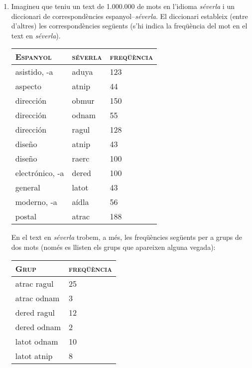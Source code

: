 \begin{enumerate}
\item Imagineu que teniu un text de 1.000.000 de mots en l'idioma
  \emph{séverla} i un diccionari de correspondències
  espanyol--\emph{séverla}. El diccionari estableix (entre d'altres)
  les correspondències següents (s'hi indica la freqüència del mot en
  el text en \emph{séverla}).
  \begin{center}
    \begin{tabular}{l|l|l}
      \hline\hline
      \textsc{Espanyol} & \textsc{séverla} & \textsc{freqüència} \\
      \hline
      \textsf{asistido, -a} & \textsf{aduya} & 123 \\
      \textsf{aspecto} & \textsf{atnip} & 44 \\ 
      \textsf{dirección} & \textsf{obmur} & 150  \\
      \textsf{dirección} & \textsf{odnam} & 55 \\
      \textsf{dirección} & \textsf{ragul} & 128 \\
      \textsf{diseño} & \textsf{atnip} & 43 \\
      \textsf{diseño} & \textsf{raerc} & 100 \\
      \textsf{electrónico, -a} & \textsf{dered} & 100 \\
      \textsf{general} & \textsf{latot}  & 43 \\
      \textsf{moderno, -a} & \textsf{aídla} & 56 \\
      \textsf{postal} & \textsf{atrac} & 188 \\
      \hline
    \end{tabular}
  \end{center}
  En el text en \emph{séverla} trobem, a més, les freqüències següents
  per a grups de dos mots (només es llisten els grups que apareixen
  alguna vegada):
  \begin{center}
    \begin{tabular}{l|l}
      \hline\hline 
      \textsc{Grup} & \textsc{freqüència} \\\hline
      \textsf{atrac ragul} & 25 \\
      \textsf{atrac odnam} & 3 \\
      \textsf{dered ragul} & 12 \\
      \textsf{dered odnam} & 2 \\
      \textsf{latot odnam} & 10 \\
      \textsf{latot atnip} & 8 \\

\end{tabular}
\end{center}
\end{enumerate}
